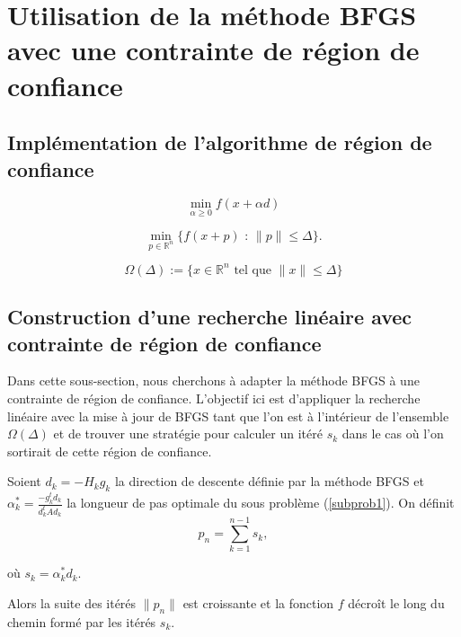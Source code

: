 \section{Utilisation de la méthode BFGS avec une contrainte de région de confiance}

\subsection{Implémentation de l'algorithme de région de confiance}


\begin{equation}\tag{SP1}\label{subprob1}
    \min\limits_{\alpha \geq 0}f(x + \alpha d)
\end{equation}

\begin{equation}\tag{SP2}\label{subprob2}
        \min\limits_{p \in \mathbb{R}^n} \{f(x + p) \text{ : } \|p\| \leq \Delta \}.
\end{equation}

\begin{equation}\tag{1}
    \Omega(\Delta) := \{x \in \mathbb{R}^n \text{ tel que } \|x\| \leq \Delta\}
\end{equation}

\subsection{Construction d'une recherche linéaire avec contrainte de région de confiance}
Dans cette sous-section, nous cherchons à adapter la méthode BFGS à une contrainte de région de confiance. L'objectif ici est d'appliquer la recherche linéaire avec la mise à jour de BFGS tant que l'on est à l'intérieur de l'ensemble $\Omega(\Delta)$ et de trouver une stratégie pour calculer un itéré $s_k$ dans le cas où l'on sortirait de cette région de confiance.

\begin{theoreme}
    Soient $d_k = -H_k g_k$ la direction de descente définie par la méthode BFGS et $\alpha_k^* = \frac{-g_k^t d_k}{d_k^t A d_k}$ la longueur de pas optimale du sous problème (\ref{subprob1}). On définit
\begin{equation}\tag{5}\label{vectors}
    p_n = \sum_{k=1}^{n-1} s_k,
\end{equation}
\begin{center}
    où $s_k = \alpha^*_k d_k$.
\end{center}
Alors la suite des itérés ${\|p_n\|}$ est croissante et la fonction $f$ décroît le long du chemin formé par les itérés $s_k$.
\end{theoreme}

